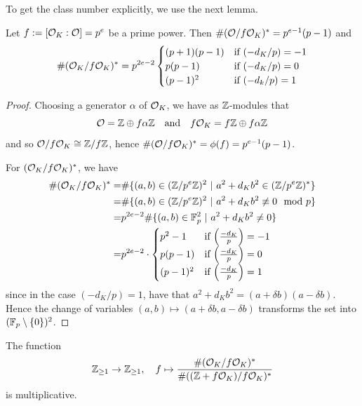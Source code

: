 To get the class number explicitly, we use the next lemma.
\begin{lemma}
    \label{prop:class_number_order_unit_fraction_prime_power}
    Let $f := [\mathcal{O}_K : \mathcal{O}] = p^e$ be a prime power.
    Then $\#(\mathcal{O}/f\mathcal{O}_K)^* = p^{e - 1}(p - 1)$ and
    \begin{equation*}
        \#(\mathcal{O}_K/f\mathcal{O}_K)^* = p^{2e - 2} \begin{cases}
            (p + 1)(p - 1) & \text{if $(-d_K/p) = -1$} \\
            p(p - 1) & \text{if $(-d_K/p) = 0$} \\
            (p - 1)^2 & \text{if $(-d_k/p) = 1$}
        \end{cases}
    \end{equation*}
\end{lemma}
\begin{proof}
    Choosing a generator $\alpha$ of $\mathcal{O}_K$, we have as $\mathbb{Z}$-modules that
    \begin{equation*}
        \mathcal{O} = \mathbb{Z} \oplus f\alpha\mathbb{Z} \quad \text{and} \quad f\mathcal{O}_K = f\mathbb{Z} \oplus f\alpha\mathbb{Z}
    \end{equation*}
    and so $\mathcal{O}/f\mathcal{O}_K \cong \mathbb{Z}/f\mathbb{Z}$, hence $\#(\mathcal{O}/f\mathcal{O}_K)^* = \phi(f) = p^{e - 1}(p - 1)$.

    For $(\mathcal{O}_K/f\mathcal{O}_K)^*$, we have
    \begin{align*}
        \#(\mathcal{O}_K/f\mathcal{O}_K)^* =& \#\{ (a, b) \in (\mathbb{Z}/p^e\mathbb{Z})^2 \ | \ a^2 + d_K b^2 \in (\mathbb{Z}/p^e\mathbb{Z})^* \} \\
        =& \#\{ (a, b) \in (\mathbb{Z}/p^e\mathbb{Z})^2 \ | \ a^2 + d_K b^2 \not\equiv 0 \mod p \} \\
        =& p^{2e - 2} \#\{ (a, b) \in \mathbb{F}_p^2 \ | \ a^2 + d_K b^2 \neq 0 \} \\
        =& p^{2e - 2} \cdot \begin{cases}
            p^2 - 1 & \text{if $\left(\frac {-d_K} p \right) = -1$} \\
            p(p - 1) & \text{if $\left(\frac {-d_K} p \right) = 0$} \\
            (p - 1)^2 & \text{if $\left(\frac {-d_K} p \right) = 1$}
        \end{cases}
    \end{align*}
    since in the case $(-d_K/p) = 1$, have that $a^2 + d_K b^2 = (a + \delta b)(a - \delta b)$.
    Hence the change of variables $(a, b) \mapsto (a + \delta b, a - \delta b)$ transforms the set into $(\mathbb{F}_p \setminus \{0\})^2$.
\end{proof}
\begin{lemma}
    \label{prop:class_number_unit_fraction_multiplicative}
    The function
    \begin{equation*}
        \mathbb{Z}_{\geq 1} \to \mathbb{Z}_{\geq 1}, \quad f \mapsto \frac {\#(\mathcal{O}_K/f\mathcal{O}_K)^*} {\#((\mathbb{Z} + f\mathcal{O}_K)/f\mathcal{O}_K)^*}
    \end{equation*}
    is multiplicative.
\end{lemma}
